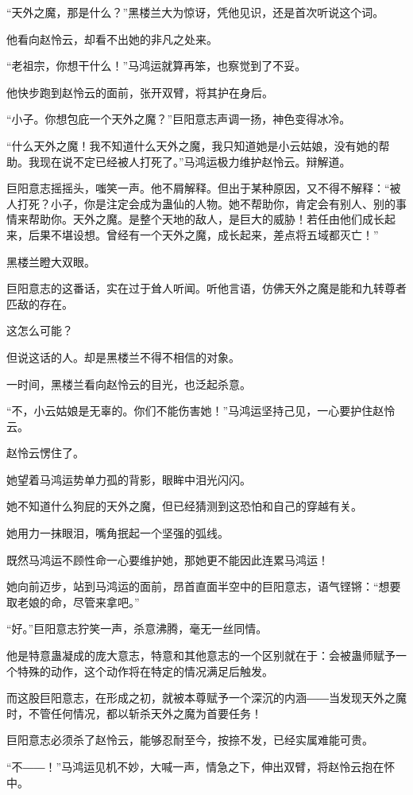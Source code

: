 \begin{this_body}
“天外之魔，那是什么？”黑楼兰大为惊讶，凭他见识，还是首次听说这个词。

他看向赵怜云，却看不出她的非凡之处来。

“老祖宗，你想干什么！”马鸿运就算再笨，也察觉到了不妥。

他快步跑到赵怜云的面前，张开双臂，将其护在身后。

“小子。你想包庇一个天外之魔？”巨阳意志声调一扬，神色变得冰冷。

“什么天外之魔！我不知道什么天外之魔，我只知道她是小云姑娘，没有她的帮助。我现在说不定已经被人打死了。”马鸿运极力维护赵怜云。辩解道。

巨阳意志摇摇头，嗤笑一声。他不屑解释。但出于某种原因，又不得不解释：“被人打死？小子，你是注定会成为蛊仙的人物。她不帮助你，肯定会有别人、别的事情来帮助你。天外之魔。是整个天地的敌人，是巨大的威胁！若任由他们成长起来，后果不堪设想。曾经有一个天外之魔，成长起来，差点将五域都灭亡！”

黑楼兰瞪大双眼。

巨阳意志的这番话，实在过于耸人听闻。听他言语，仿佛天外之魔是能和九转尊者匹敌的存在。

这怎么可能？

但说这话的人。却是黑楼兰不得不相信的对象。

一时间，黑楼兰看向赵怜云的目光，也泛起杀意。

“不，小云姑娘是无辜的。你们不能伤害她！”马鸿运坚持己见，一心要护住赵怜云。

赵怜云愣住了。

她望着马鸿运势单力孤的背影，眼眸中泪光闪闪。

她不知道什么狗屁的天外之魔，但已经猜测到这恐怕和自己的穿越有关。

她用力一抹眼泪，嘴角抿起一个坚强的弧线。

既然马鸿运不顾性命一心要维护她，那她更不能因此连累马鸿运！

她向前迈步，站到马鸿运的面前，昂首直面半空中的巨阳意志，语气铿锵：“想要取老娘的命，尽管来拿吧。”

“好。”巨阳意志狞笑一声，杀意沸腾，毫无一丝同情。

他是特意蛊凝成的庞大意志，特意和其他意志的一个区别就在于：会被蛊师赋予一个特殊的动作，这个动作将在特定的情况满足后触发。

而这股巨阳意志，在形成之初，就被本尊赋予一个深沉的内涵――当发现天外之魔时，不管任何情况，都以斩杀天外之魔为首要任务！

巨阳意志必须杀了赵怜云，能够忍耐至今，按捺不发，已经实属难能可贵。

“不――！”马鸿运见机不妙，大喊一声，情急之下，伸出双臂，将赵怜云抱在怀中。


\end{this_body}
